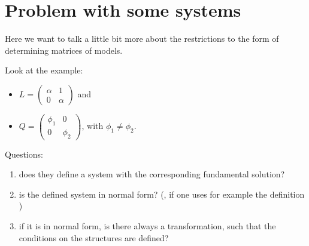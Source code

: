 \chapter{Problem with some systems}
Here we want to talk a little bit more about the restrictions to the form of
determining matrices of models.

Look at the example:
\begin{itemize}
  \item $L=\begin{pmatrix} \alpha & 1 \\ 0 & \alpha \end{pmatrix}$ and
  \item $Q=\begin{pmatrix} \phi_1 & 0 \\ 0 & \phi_2 \end{pmatrix}$, with
    $\phi_1\neq\phi_2$.
\end{itemize}
Questions:
\begin{enumerate}
  \item does they define a system with the corresponding fundamental solution?
    \checkmark
  \item is the defined system in normal form?
    (\checkmark{}, if one uses for example the definition \cite[p.853]{loday1994})
  \item if it is in normal form, is there always a transformation, such that
    the conditions on the structures are defined?
\end{enumerate}
